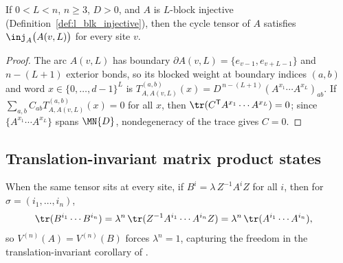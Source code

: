 \begin{lemma}%
    \label{lem:regionBlockedTensorInjective_cycleTensorOfMPS}
    \leanok
    If $0 < L < n$, $n \ge 3$, $D>0$, and $A$ is $L$-block injective
    (Definition~\ref{def:l_blk_injective}), then the cycle tensor of $A$
    satisfies $\inj_A\bigl(A(v,L)\bigr)$ for every site $v$.
\end{lemma}
\begin{proof}\leanok
    The arc $A(v,L)$ has boundary $\partial A(v,L)=\{e_{v-1},e_{v+L-1}\}$ and
    $n-(L+1)$ exterior bonds, so its blocked weight at boundary indices $(a,b)$
    and word $x\in\{0,\ldots,d-1\}^L$ is
    $T_{A,A(v,L)}^{(a,b)}(x)=D^{\,n-(L+1)}(A^{x_1}\cdots A^{x_L})_{ab}$.
    If $\sum_{a,b}C_{ab}T_{A,A(v,L)}^{(a,b)}(x)=0$ for all $x$, then
    $\tr(C^{\mathsf T}A^{x_1}\cdots A^{x_L})=0$; since $\{A^{x_1}\cdots A^{x_L}\}$
    spans $\MN{D}$, nondegeneracy of the trace gives $C=0$.
\end{proof}

\subsection{Translation-invariant matrix product states}

When the same tensor sits at every site, if $B^i = \lambda\,Z^{-1}A^iZ$ for all
$i$, then for $\sigma=(i_1,\ldots,i_n)$,
\begin{align}
    \tr(B^{i_1}\cdots B^{i_n})
     & = \lambda^n\,\tr(Z^{-1}A^{i_1}\cdots A^{i_n}Z)
    = \lambda^n\,\tr(A^{i_1}\cdots A^{i_n}),
    \notag
\end{align}
so $V^{(n)}(A)=V^{(n)}(B)$ forces $\lambda^n = 1$, capturing the freedom in the
translation-invariant corollary of \cite[Section~4]{Molnar2018NormalPEPS}.

